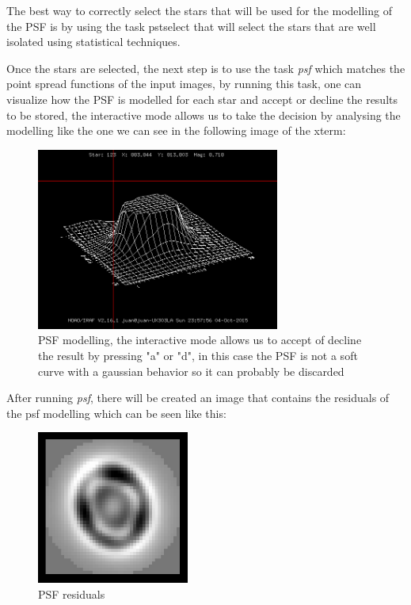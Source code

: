 The best way to correctly select the stars that will be used for the modelling of the PSF is by using the task pstselect that will select the stars that are well isolated using statistical techniques. 

Once the stars are selected, the next step is to use the task \textit{psf} which matches the point spread functions of the input images, by running this task, one can visualize how the PSF is modelled for each star and accept or decline the results to be stored, the interactive mode allows us to take the decision by analysing the modelling like the one we can see in the following image of the xterm:

\begin{figure}[H]
\centering
\includegraphics[width=8cm]{images/psf.png}
\caption{PSF modelling, the interactive mode allows us to accept of decline the result by pressing "a" or "d", in this case the PSF is not a soft curve with a gaussian behavior so it can probably be discarded}
\end{figure}

After running \textit{psf}, there will be created an image that contains the residuals of the psf modelling which can be seen like this:

\begin{figure}[H]
\centering
\includegraphics[width=5cm]{images/psf2.png}
\caption{PSF residuals}
\end{figure}

